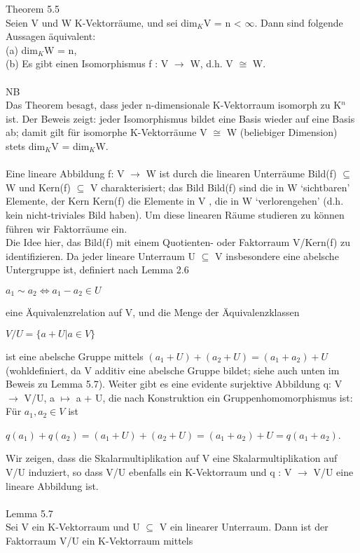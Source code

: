 Theorem 5.5\\
Seien V und W K-Vektorräume, und sei dim$_K$V = n < $\infty$. Dann sind folgende Aussagen äquivalent:\\
(a) dim$_K$W = n, \\
(b) Es gibt einen Isomorphismus f : V $\to$ W, d.h. V $\cong$ W.\\
\\
NB\\
Das Theorem besagt, dass jeder n-dimensionale K-Vektorraum isomorph zu K$^n$ ist. Der Beweis zeigt: jeder Isomorphismus bildet eine Basis wieder auf eine Basis ab; damit gilt für isomorphe K-Vektorräume V $\cong$ W (beliebiger Dimension) stets dim$_K$V = dim$_K$W.\\
\\
Eine lineare Abbildung f: V $\to$ W ist durch die linearen Unterräume Bild(f) $\subseteq$ W und Kern(f) $\subseteq$ V charakterisiert; das Bild Bild(f) sind die in W ‘sichtbaren’ Elemente, der Kern Kern(f) die Elemente in V , die in W ‘verlorengehen’ (d.h. kein nicht-triviales Bild haben). Um diese linearen Räume studieren zu können führen wir Faktorräume ein.\\
Die Idee hier, das Bild(f) mit einem Quotienten- oder Faktorraum V/Kern(f) zu identifizieren. Da jeder lineare Unterraum U $\subseteq$ V insbesondere eine abelsche Untergruppe ist, definiert nach Lemma 2.6
\begin{center}
$a_1 \sim a_2 \Leftrightarrow a_1 - a_2 \in U$
\end{center}
eine Äquivalenzrelation auf V, und die Menge der Äquivalenzklassen
\begin{center}
$V /U = \{a + U | a \in V \}$
\end{center}
ist eine abelsche Gruppe mittels $(a_1 + U) + (a_2 + U) = (a_1 + a_2) + U$ (wohldefiniert, da V additiv eine abelsche Gruppe bildet; siehe auch unten im Beweis zu Lemma 5.7). Weiter gibt es eine evidente surjektive Abbildung q: V $\to$ V/U, a $\mapsto$ a + U, die nach Konstruktion ein Gruppenhomomorphismus ist: Für $a_1, a_2 \in V$ ist
\begin{center}
$q(a_1)+q(a_2)=(a_1 +U)+(a_2 +U)=(a_1 +a_2)+U =q(a_1 +a_2)$.
\end{center}
Wir zeigen, dass die Skalarmultiplikation auf V eine Skalarmultiplikation auf V/U induziert, so dass V/U ebenfalls ein K-Vektorraum und q : V $\to$ V/U eine lineare Abbildung ist.\\
\\
Lemma 5.7\\
Sei V ein K-Vektorraum und U $\subseteq$ V ein linearer Unterraum. Dann ist der Faktorraum V/U ein K-Vektorraum mittels
